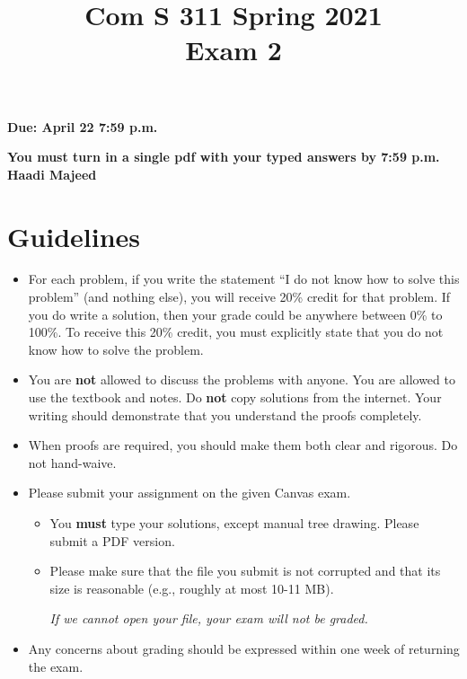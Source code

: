 \documentclass[11pt]{amsart}
\begin{document}


\title{
Com S 311 Spring 2021\\
Exam 2
}

\maketitle


\vspace{-.8cm}
\begin{center}
{\bf Due:  April 22 7:59 p.m.}

\smallskip
\textbf{You must turn in a single pdf with your typed answers by 7:59 p.m.}\\
\textbf{Haadi Majeed}\\
\end{center}

\medskip

\section*{Guidelines}


\begin{itemize}

\item %
For each problem, if you write  the statement ``I do not know how to solve this problem'' (and nothing else), you will receive 20\% credit for that problem. If you do write a solution, then your grade could be anywhere between 0\% to 100\%.
To receive this 20\% credit, you must explicitly state that you do not know how to solve the problem.

\item You are \textbf{not} allowed to discuss the problems with anyone. You are allowed to use the textbook and notes. Do \textbf{not} copy solutions from the internet. Your writing should demonstrate that you understand the proofs completely.

\item When proofs are required, you should make them both clear and rigorous. Do not hand-waive.

 \item Please submit your assignment on the given Canvas exam.
 \begin{itemize}
\item  You \textbf{must} type your solutions, except manual tree drawing. Please submit a PDF version.
\item Please make sure that the file you submit is not corrupted and that its size is reasonable (e.g., roughly at most 10-11 MB).
\begin{center}
\emph{If we cannot open your file, your exam will not be graded.}
\end{center}
\end{itemize}

\item Any concerns about grading should be expressed within one week of
returning the exam. 
 
\end{itemize}
\end{document}
